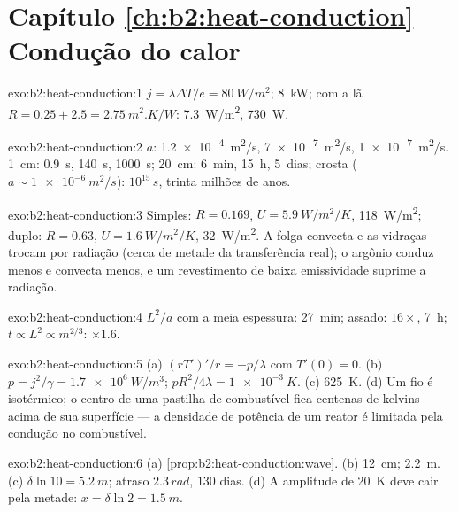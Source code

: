 \section*{Capítulo \ref{ch:b2:heat-conduction} --- Condução do calor}

\begin{solution}{exo:b2:heat-conduction:1}
$j = \lambda\Delta T/e = \qty{80}{W/m^2}$; \qty{8}{kW}; com a lã $R = 0.25 + 2.5 =
\qty{2.75}{m^2.K/W}$: \qty{7.3}{W/m^2}, \qty{730}{W}.
\end{solution}

\begin{solution}{exo:b2:heat-conduction:2}
$a$: \qty{1.2e-4}{m^2/s}, \qty{7e-7}{m^2/s}, \qty{1e-7}{m^2/s}. \qty{1}{cm}:
\qty{0.9}{s}, \qty{140}{s}, \qty{1000}{s}; \qty{20}{cm}: \qty{6}{min}, \qty{15}{h},
\qty{5}{dias}; crosta ($a \sim \qty{1e-6}{m^2/s}$): $10^{15}\,\unit{s}$, trinta
milhões de anos.
\end{solution}

\begin{solution}{exo:b2:heat-conduction:3}
Simples: $R = 0.169$, $U = \qty{5.9}{W/m^2/K}$, \qty{118}{W/m^2}; duplo: $R =
0.63$, $U = \qty{1.6}{W/m^2/K}$, \qty{32}{W/m^2}. A folga convecta e as vidraças
trocam por radiação (cerca de metade da transferência real); o argônio conduz
menos e convecta menos, e um revestimento de baixa emissividade suprime a
radiação.
\end{solution}

\begin{solution}{exo:b2:heat-conduction:4}
$L^2/a$ com a meia espessura: \qty{27}{min}; assado: $16\times$, \qty{7}{h};
$t \propto L^2 \propto m^{2/3}$: $\times 1.6$.
\end{solution}

\begin{solution}{exo:b2:heat-conduction:5}
(a) $(rT')'/r = -p/\lambda$ com $T'(0) = 0$. (b) $p = j^2/\gamma = \qty{1.7e6}{W/m^3}$;
$pR^2/4\lambda = \qty{1e-3}{K}$. (c) \qty{625}{K}. (d) Um fio é isotérmico; o centro
de uma pastilha de combustível fica centenas de kelvins acima de sua superfície --- a densidade
de potência de um reator é limitada pela condução no combustível.
\end{solution}

\begin{solution}{exo:b2:heat-conduction:6}
(a) \cref{prop:b2:heat-conduction:wave}. (b) \qty{12}{cm}; \qty{2.2}{m}. (c)
$\delta\ln 10 = \qty{5.2}{m}$; atraso $2.3\,\unit{rad}$, $130$ dias. (d) A
amplitude de \qty{20}{K} deve cair pela metade: $x = \delta\ln 2 = \qty{1.5}{m}$.
\end{solution}

